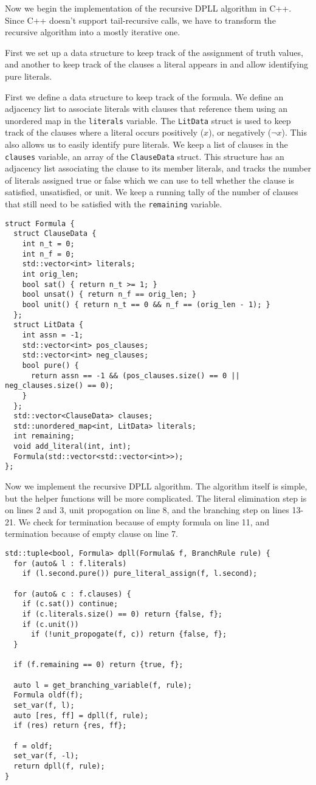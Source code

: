 \documentclass[10pt,AMS Euler]{article}
\begin{document}
Now we begin the implementation of the recursive DPLL algorithm in C++. Since C++ doesn't
support tail-recursive calls, we have to transform the recursive algorithm into a mostly
iterative one.

First we set up a data structure to keep track of the assignment of truth values, and another to keep
track of the clauses a literal appears in and allow identifying pure literals.

First we define a data structure to keep track of the formula. We define an adjacency list to
associate literals with clauses that reference them using an unordered map in the \texttt{literals} variable.
The \texttt{LitData} struct is used to keep track of the clauses where a literal occurs positively (\(x\)),
or negatively (\(\neg x\)). This also allows us to easily identify pure literals. We keep a list of 
clauses in the \texttt{clauses} variable, an array of the \texttt{ClauseData} struct. This structure has an adjacency
list associating the clause to its member literals, and tracks the number of literals assigned true
or false which we can use to tell whether the clause is satisfied, unsatisfied, or unit.
We keep a running tally of the number of clauses that still need to be satisfied with the
\texttt{remaining} variable.
\begin{verbatim}
struct Formula {
  struct ClauseData {
    int n_t = 0;
    int n_f = 0;
    std::vector<int> literals;
    int orig_len;
    bool sat() { return n_t >= 1; }
    bool unsat() { return n_f == orig_len; }
    bool unit() { return n_t == 0 && n_f == (orig_len - 1); }
  };
  struct LitData {
    int assn = -1;
    std::vector<int> pos_clauses;
    std::vector<int> neg_clauses;
    bool pure() {
      return assn == -1 && (pos_clauses.size() == 0 || neg_clauses.size() == 0);
    }
  };
  std::vector<ClauseData> clauses;
  std::unordered_map<int, LitData> literals;
  int remaining;
  void add_literal(int, int);
  Formula(std::vector<std::vector<int>>); 
};
\end{verbatim}

Now we implement the recursive DPLL algorithm.
The algorithm itself is simple, but the helper functions will be more
complicated. The literal elimination step is on lines 2 and 3,
unit propogation on line 8, and the branching step on lines 13-21.
We check for termination because of empty formula on line 11, and termination
because of empty clause on line 7.
\begin{verbatim}
std::tuple<bool, Formula> dpll(Formula& f, BranchRule rule) {
  for (auto& l : f.literals)
    if (l.second.pure()) pure_literal_assign(f, l.second);
  
  for (auto& c : f.clauses) {
    if (c.sat()) continue;
    if (c.literals.size() == 0) return {false, f};
    if (c.unit())
      if (!unit_propogate(f, c)) return {false, f};
  }
  
  if (f.remaining == 0) return {true, f};
  
  auto l = get_branching_variable(f, rule);
  Formula oldf(f);
  set_var(f, l);
  auto [res, ff] = dpll(f, rule);
  if (res) return {res, ff};
  
  f = oldf;
  set_var(f, -l);
  return dpll(f, rule);
}
\end{verbatim}
\end{document}
